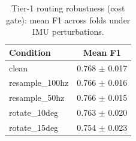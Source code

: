 \begin{table}[!t]
\centering
\caption{Tier-1 routing robustness (cost gate): mean F1 across folds under IMU perturbations.}
\label{tab:robustness}
\begin{tabular}{lc}
\toprule
Condition & Mean F1 \\
\midrule
clean & 0.768 $\pm$ 0.017 \\
resample\_100hz & 0.766 $\pm$ 0.016 \\
resample\_50hz & 0.766 $\pm$ 0.015 \\
rotate\_10deg & 0.763 $\pm$ 0.020 \\
rotate\_15deg & 0.754 $\pm$ 0.023 \\
\bottomrule
\end{tabular}
\end{table}
